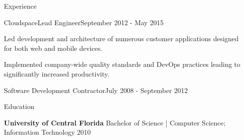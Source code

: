 \documentclass{resume} %
\begin{document}
\begin{rSection}{Experience}
\begin{rSubsection}{Cloudspace}{Lead Engineer}{September 2012 - May 2015}
\item Led development and architecture of numerous customer applications designed for both web and mobile devices.
\item Implemented company-wide quality standards and DevOps practices leading to significantly increased productivity.

\end{rSubsection}


\begin{rSubsectionTitleOnly}{Software Development Contractor}{July 2008 - September 2012}
\end{rSubsectionTitleOnly}



\end{rSection}

\vspace{0.5em} %
\begin{rSection}{Education}

    {\bf University of Central Florida } Bachelor of Science | Computer Science; Information Technology  \hfill 2010

\end{rSection}
\end{document}
